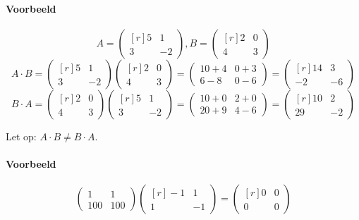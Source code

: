 \paragraph{Voorbeeld}
\[ A = \begin{pmatrix*}[r] 5 & 1 \\ 3 & -2 \end{pmatrix*}, B = \begin{pmatrix*}[r] 2 & 0 \\ 4 & 3 \end{pmatrix*} \]
\[ A \cdot B = \begin{pmatrix*}[r] 5 & 1 \\ 3 & -2 \end{pmatrix*} \begin{pmatrix*}[r] 2 & 0 \\ 4 & 3 \end{pmatrix*} = \begin{pmatrix} 10+4 & 0+3 \\ 6-8 & 0-6 \end{pmatrix} = \begin{pmatrix*}[r] 14 & 3 \\ -2 & -6 \end{pmatrix*} \]
\[ B \cdot A = \begin{pmatrix*}[r] 2 & 0 \\ 4 & 3 \end{pmatrix*} \begin{pmatrix*}[r] 5 & 1 \\ 3 & -2 \end{pmatrix*} = \begin{pmatrix} 10+0 & 2+0 \\ 20+9 & 4-6 \end{pmatrix} = \begin{pmatrix*}[r] 10 & 2 \\ 29 & -2 \end{pmatrix*} \]

Let op: $A \cdot B \neq B \cdot A$. 

\paragraph{Voorbeeld}
\[ \begin{pmatrix} 1 & 1 \\ 100 & 100 \end{pmatrix} \begin{pmatrix*}[r] -1 & 1 \\ 1 & -1 \end{pmatrix*} = \begin{pmatrix*}[r] 0 & 0 \\ 0 & 0 \end{pmatrix*} \]

